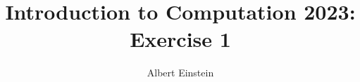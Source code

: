 \title{
  \color{red}
  Introduction to Computation 2023:\\
  Exercise 1
}
\ifanonymous{\iflncs
\author{}\institute{}
\fi}
\else
\author{
  {\color{red}Albert Einstein}
}
\iflncs
{}
\else
{}
\fi
\fi
